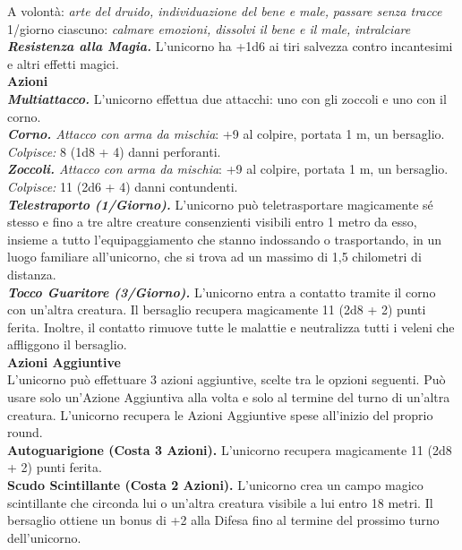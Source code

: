 \begin{multicols}{2}
A volontà: \emph{arte del druido, individuazione del bene e male,} \emph{passare senza tracce}\\
1/giorno ciascuno: \emph{calmare emozioni, dissolvi il bene e il male,} \emph{intralciare}\\
\emph{\textbf{Resistenza alla Magia.}} L'unicorno ha +1d6 ai tiri salvezza contro incantesimi e altri effetti magici.\\
\smallskip\textbf{Azioni}\\
\emph{\textbf{Multiattacco.}} L'unicorno effettua due attacchi: uno con gli zoccoli e uno con il corno.\\
\emph{\textbf{Corno.} Attacco con arma da mischia}: +9 al colpire, portata 1 m, un bersaglio.\\
\emph{Colpisce:} 8 (1d8 + 4) danni perforanti.\\
\emph{\textbf{Zoccoli.} Attacco con arma da mischia}: +9 al colpire, portata 1 m, un bersaglio.\\
\emph{Colpisce:} 11 (2d6 + 4) danni contundenti.\\
\emph{\textbf{Telestraporto (1/Giorno).}} L'unicorno può teletrasportare magicamente sé stesso e fino a tre altre creature consenzienti visibili entro 1 metro da esso, insieme a tutto l'equipaggiamento che stanno indossando o trasportando, in un luogo familiare all'unicorno, che si trova ad un massimo di 1,5 chilometri di distanza.\\
\emph{\textbf{Tocco Guaritore (3/Giorno).}} L'unicorno entra a contatto tramite il corno con un'altra creatura. Il bersaglio recupera magicamente 11 (2d8 + 2) punti ferita. Inoltre, il contatto rimuove tutte le malattie e neutralizza tutti i veleni che affliggono il bersaglio.\\
\textbf{Azioni Aggiuntive}\\
L'unicorno può effettuare 3 azioni aggiuntive, scelte tra le opzioni seguenti. Può usare solo un'Azione Aggiuntiva alla volta e solo al termine del turno di un'altra creatura. L'unicorno recupera le Azioni Aggiuntive spese all'inizio del proprio round.\\
\textbf{Autoguarigione (Costa 3 Azioni).} L'unicorno recupera magicamente 11 (2d8 + 2) punti ferita.\\
\textbf{Scudo Scintillante (Costa 2 Azioni).} L'unicorno crea un campo magico scintillante che circonda lui o un'altra creatura visibile a lui entro 18 metri. Il bersaglio ottiene un bonus di +2 alla Difesa fino al termine del prossimo turno dell'unicorno.\\

\end{multicols}
